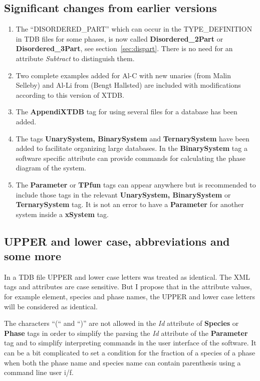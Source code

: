 \documentclass{article}
\begin{document}
\subsection{Significant changes from earlier versions}\label{sec:changes}

\begin{enumerate}
\item The ``DISORDERED\_PART'' which can occur in the TYPE\_DEFINITION
  in TDB files for some phases, is now called {\bf Disordered\_2Part}
  or {\bf Disordered\_3Part}, see section~\ref{sec:dispart}.  There is
  no need for an attribute {\em Subtract} to distinguish them.

\item Two complete examples added for Al-C with new unaries (from
  Malin Selleby) and Al-Li from (Bengt Hallsted) are included with
  modifications according to this version of XTDB.

\item The {\bf AppendiXTDB} tag for using several files for a database
  has been added.

\item The tags {\bf UnarySystem, BinarySystem} and {\bf TernarySystem}
  have been added to facilitate organizing large databases.  In the
  {\bf BinarySystem} tag a software specific attribute can provide
  commands for calculating the phase diagram of the system.

\item The {\bf Parameter} or {\bf TPfun} tags can appear anywhere but
  is recommended to include those tags in the relevant {\bf
    UnarySystem, BinarySystem} or {\bf TernarySystem} tag.  It is not
  an error to have a {\bf Parameter} for another system inside a {\bf
    xSystem} tag.

\end{enumerate}

\subsection{UPPER and lower case, abbreviations and some more}

In a TDB file UPPER and lower case letters was treated as identical.
The XML tags and attributes are case sensitive.  But I propose that in
the attribute values, for example element, species and phase names,
the UPPER and lower case letters will be considered as identical.

The characters ``(`` and ``)'' are not allowed in the {\em Id}
attribute of {\bf Species} or {\bf Phase} tags in order to simplify
the parsing the {\em Id} attribute of the {\bf Parameter} tag and to
simplify interpreting commands in the user interface of the software.
It can be a bit complicated to set a condition for the fraction of a
species of a phase when both the phase name and species name can
contain parenthesis using a command line user i/f.
\end{document}
